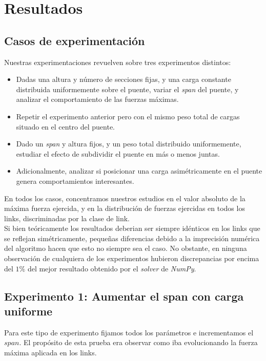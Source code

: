 \section{Resultados}

\subsection{Casos de experimentación}

Nuestras experimentaciones revuelven sobre tres experimentos distintos:
\begin{itemize}
	\item Dadas una altura y número de secciones fijas, y una carga constante distribuida uniformemente sobre el puente, variar el \textit{span} del puente, y analizar el comportamiento de las fuerzas máximas.
	\item Repetir el experimento anterior pero con el mismo peso total de cargas situado en el centro del puente.
	\item Dado un \textit{span} y altura fijos, y un peso total distribuido uniformemente, estudiar el efecto de subdividir el puente en más o menos juntas.
	\item Adicionalmente, analizar si posicionar una carga asimétricamente en el puente genera comportamientos interesantes.
\end {itemize}

En todos los casos, concentramos nuestros estudios en el valor absoluto de la máxima fuerza ejercida, y en la distribución de fuerzas ejercidas en todos los links, discriminadas por la clase de link.\\

Si bien teóricamente los resultados deberian ser siempre idénticos en los links
que se reflejan simétricamente, pequeñas diferencias debido a la imprecisión
numérica del algoritmo hacen que esto no siempre sea el caso. No obstante,
en ninguna observación de cualquiera de los experimentos hubieron discrepancias
por encima del $1\%$ del mejor resultado obtenido por el \textit{solver} de \textit{NumPy}.\\

\subsection{Experimento 1: Aumentar el span con carga uniforme}

Para este tipo de experimento fijamos todos los parámetros e incrementamos el $span$. El propósito de esta prueba era observar como iba evolucionando la fuerza máxima aplicada en los links.\\

